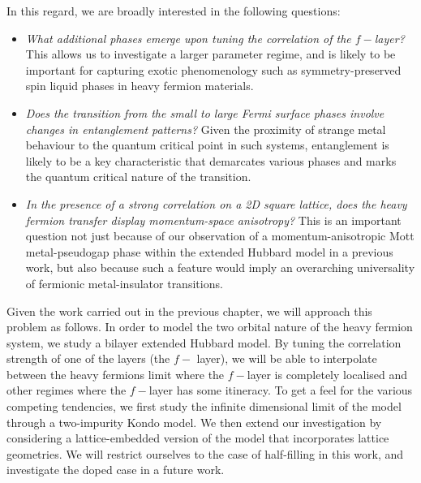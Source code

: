In this regard, we are broadly interested in the following questions:
\begin{itemize}
	\item {\it What additional phases emerge upon tuning the correlation of the \(f-\)layer?} This allows us to investigate a larger parameter regime, and is likely to be important for capturing exotic phenomenology such as symmetry-preserved spin liquid phases in heavy fermion materials.
	\item {\it Does the transition from the small to large Fermi surface phases involve changes in entanglement patterns?} Given the proximity of strange metal behaviour to the quantum critical point in such systems, entanglement is likely to be a key characteristic that demarcates various phases and marks the quantum critical nature of the transition.
	\item {\it In the presence of a strong correlation on a 2D square lattice, does the heavy fermion transfer display momentum-space anisotropy?} This is an important question not just because of our observation of a momentum-anisotropic Mott metal-pseudogap phase within the extended Hubbard model in a previous work, but also because such a feature would imply an overarching universality of fermionic metal-insulator transitions.
\end{itemize}

Given the work carried out in the previous chapter, we will approach this problem as follows. In order to model the two orbital nature of the heavy fermion system, we study a bilayer extended Hubbard model. By tuning the correlation strength of one of the layers (the \(f-\) layer), we will be able to interpolate between the heavy fermions limit where the \(f-\)layer is completely localised and other regimes where the \(f-\)layer has some itineracy. To get a feel for the various competing tendencies, we first study the infinite dimensional limit of the model through a two-impurity Kondo model. We then extend our investigation by considering a lattice-embedded version of the model that incorporates lattice geometries. We will restrict ourselves to the case of half-filling in this work, and investigate the doped case in a future work.


